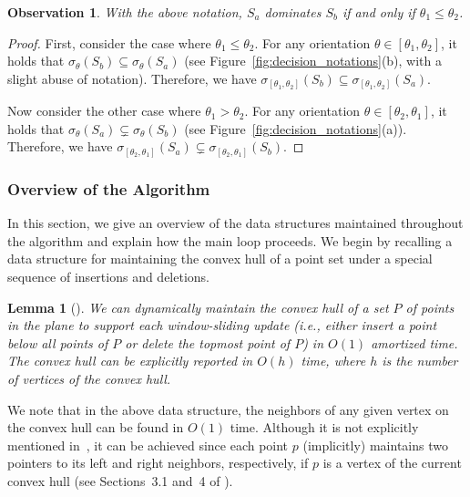 \documentclass[10pt,a4paper]{article}
\newtheorem{lemma}[theorem]{Lemma}
\newtheorem{observation}[theorem]{Observation}
\theoremstyle{star}
\theoremstyle{claimstar}
\begin{document}
\begin{observation}
    \label{obs:domination}
    With the above notation, $S_a$ dominates $S_b$ if and only if $\theta_1 \le \theta_2$. 
\end{observation}

\begin{proof}
    First, consider the case where $\theta_1 \le \theta_2$. 
    For any orientation $\theta \in [\theta_1, \theta_2]$, it holds that $\sigma_{\theta}(S_b) \subseteq \sigma_{\theta}(S_a)$ (see Figure~\ref{fig:decision_notations}(b), with a slight abuse of notation).
    Therefore, we have $\sigma_{[\theta_1, \theta_2]}(S_b) \subseteq \sigma_{[\theta_1, \theta_2]}(S_a)$.

    Now consider the other case where $\theta_1 > \theta_2$.
    For any orientation $\theta \in [\theta_2, \theta_1]$, it holds that $\sigma_{\theta}(S_a) \subsetneq \sigma_{\theta}(S_b)$ (see Figure~\ref{fig:decision_notations}(a)). 
    Therefore, we have $\sigma_{[\theta_2, \theta_1]}(S_a) \subsetneq \sigma_{[\theta_2, \theta_1]}(S_b)$.
\end{proof}



\subsubsection{Overview of the Algorithm}
\label{sec:decision_overview}

In this section, we give an overview of the data structures maintained throughout the algorithm and explain how the main loop proceeds. 
We begin by recalling a data structure for maintaining the convex hull of a point set under a special sequence of insertions and deletions.


\begin{lemma}[\cite{wang2023dynamic}]
\label{lem:dyn_conv}
    We can dynamically maintain the convex hull of a set $P$ of points in the plane to support each \emph{window-sliding update} (i.e., either insert a point below all points of $P$ or delete the topmost point of $P$) in $O(1)$ amortized time. 
    The convex hull can be explicitly reported in $O(h)$ time, where $h$ is the number of vertices of the convex hull. 
\end{lemma}

We note that in the above data structure, the neighbors of any given vertex on the convex hull can be found in $O(1)$ time. 
Although it is not explicitly mentioned in~\cite{wang2023dynamic}, it can be achieved since each point $p$ (implicitly) maintains two pointers to its left and right neighbors, respectively, if $p$ is a vertex of the current convex hull (see Sections~3.1 and~4 of \cite{wang2023dynamic}).
\end{document}
